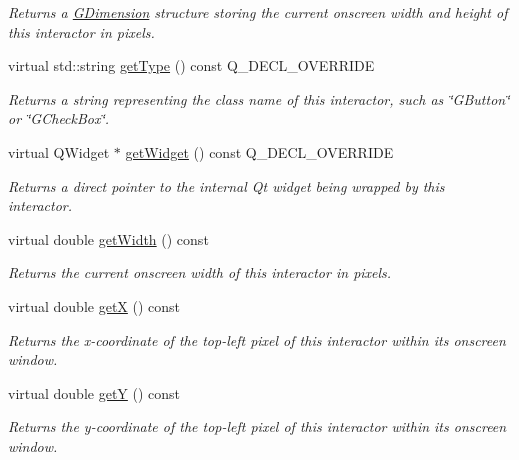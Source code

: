 \begin{DoxyCompactItemize}
\begin{DoxyCompactList}\small\item\em Returns a \mbox{\hyperlink{classGDimension}{G\+Dimension}} structure storing the current onscreen width and height of this interactor in pixels. \end{DoxyCompactList}\item 
virtual std\+::string \mbox{\hyperlink{classGCanvas_a9896d58fcfebbf1025aeeb5b8b9ede80}{get\+Type}} () const Q\+\_\+\+D\+E\+C\+L\+\_\+\+O\+V\+E\+R\+R\+I\+DE
\begin{DoxyCompactList}\small\item\em Returns a string representing the class name of this interactor, such as \char`\"{}\+G\+Button\char`\"{} or \char`\"{}\+G\+Check\+Box\char`\"{}. \end{DoxyCompactList}\item 
virtual Q\+Widget $\ast$ \mbox{\hyperlink{classGCanvas_a326ee51b5561f807df7b29a1c101f7fd}{get\+Widget}} () const Q\+\_\+\+D\+E\+C\+L\+\_\+\+O\+V\+E\+R\+R\+I\+DE
\begin{DoxyCompactList}\small\item\em Returns a direct pointer to the internal Qt widget being wrapped by this interactor. \end{DoxyCompactList}\item 
virtual double \mbox{\hyperlink{classGInteractor_a0ed2965abd4f5701d2cadf71239faf19}{get\+Width}} () const
\begin{DoxyCompactList}\small\item\em Returns the current onscreen width of this interactor in pixels. \end{DoxyCompactList}\item 
virtual double \mbox{\hyperlink{classGInteractor_a344385751bee0720059403940d57a13e}{getX}} () const
\begin{DoxyCompactList}\small\item\em Returns the x-\/coordinate of the top-\/left pixel of this interactor within its onscreen window. \end{DoxyCompactList}\item 
virtual double \mbox{\hyperlink{classGInteractor_aafa51c7f8f38a09febbb9ce7853f77b4}{getY}} () const
\begin{DoxyCompactList}\small\item\em Returns the y-\/coordinate of the top-\/left pixel of this interactor within its onscreen window. \end{DoxyCompactList}\item 

\end{DoxyCompactItemize}
